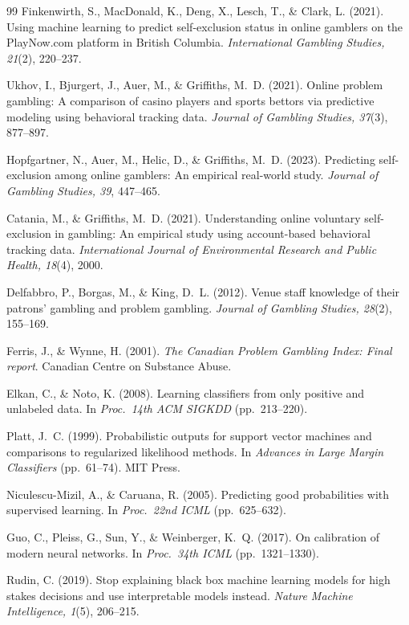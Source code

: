 \documentclass[11pt]{article}
\begin{document}
\begin{thebibliography}{99}
 Finkenwirth, S., MacDonald, K., Deng, X., Lesch, T., \&
Clark, L. (2021). Using machine learning to predict self-exclusion status in online
gamblers on the PlayNow.com platform in British Columbia. \emph{International Gambling
Studies, 21}(2), 220--237.

 Ukhov, I., Bjurgert, J., Auer, M., \& Griffiths, M.~D. (2021).
Online problem gambling: A comparison of casino players and sports bettors via
predictive modeling using behavioral tracking data. \emph{Journal of Gambling Studies,
37}(3), 877--897.

 Hopfgartner, N., Auer, M., Helic, D., \& Griffiths, M.~D.
(2023). Predicting self-exclusion among online gamblers: An empirical real-world study.
\emph{Journal of Gambling Studies, 39}, 447--465.

 Catania, M., \& Griffiths, M.~D. (2021). Understanding online
voluntary self-exclusion in gambling: An empirical study using account-based behavioral
tracking data. \emph{International Journal of Environmental Research and Public Health,
18}(4), 2000.

 Delfabbro, P., Borgas, M., \& King, D.~L. (2012). Venue staff
knowledge of their patrons' gambling and problem gambling. \emph{Journal of Gambling
Studies, 28}(2), 155--169.

 Ferris, J., \& Wynne, H. (2001). \emph{The Canadian Problem
Gambling Index: Final report}. Canadian Centre on Substance Abuse.

 Elkan, C., \& Noto, K. (2008). Learning classifiers from only
positive and unlabeled data. In \emph{Proc.\ 14th ACM SIGKDD} (pp.~213--220).

 Platt, J.~C. (1999). Probabilistic outputs for support vector
machines and comparisons to regularized likelihood methods. In \emph{Advances in Large
Margin Classifiers} (pp.~61--74). MIT Press.

 Niculescu-Mizil, A., \& Caruana, R. (2005). Predicting good
probabilities with supervised learning. In \emph{Proc.\ 22nd ICML} (pp.~625--632).

 Guo, C., Pleiss, G., Sun, Y., \& Weinberger, K.~Q. (2017). On
calibration of modern neural networks. In \emph{Proc.\ 34th ICML} (pp.~1321--1330).

 Rudin, C. (2019). Stop explaining black box machine learning models
for high stakes decisions and use interpretable models instead. \emph{Nature Machine
Intelligence, 1}(5), 206--215.


\end{thebibliography}
\end{document}

